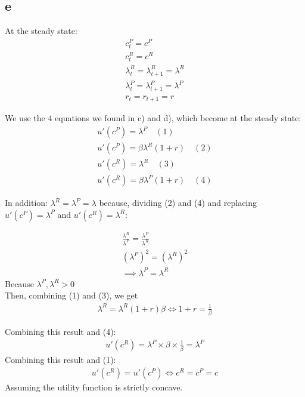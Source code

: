 \documentclass{article}
\begin{document}
\subsection{e}
At the steady state: \\
\begin{gather*}
    c_t^P=c^P\\
    c_t^R=c^R\\
    \lambda^R_t=\lambda^R_{t+1}=\lambda^R\\
    \lambda^P_t=\lambda^P_{t+1}=\lambda^P\\
    r_t=r_{t+1}=r
\end{gather*}

We use the 4 equations we found in c) and d), which become at the steady state:
\begin{gather*}
    u'(c^P)=\lambda^P\quad (1)\\
    u'(c^P)=\beta\lambda^R (1+r)\quad (2)\\
    u'(c^R)=\lambda^R\quad (3)\\
    u'(c^R)=\beta\lambda^P (1+r)\quad (4)
\end{gather*}

In addition: $\lambda^R=\lambda^P=\lambda$ because, dividing (2) and (4) and replacing $u'(c^P)=\lambda^P$ and $u'(c^R)=\lambda^R$:

\begin{gather*}
    \frac{\lambda^R}{\lambda^P} = \frac{\lambda^P}{\lambda^R} \\
    (\lambda^{P})^2 = (\lambda^{R})^2 \\
    \implies \lambda^P = \lambda^R
\end{gather*}
Because $\lambda^P, \lambda^R>0$ \\

Then, combining (1) and (3), we get
\begin{gather*}
    \lambda^R=\lambda^R(1+r)\beta\Leftrightarrow 1+r=\frac{1}{\beta}
\end{gather*}

Combining this result and (4):
\begin{gather*}
    u'(c^R)=\lambda^P\times\beta\times\frac{1}{\beta}=\lambda^P
\end{gather*}
Combining this result and (1):
\begin{gather*}
    u'(c^R)=u'(c^P)\Leftrightarrow c^R=c^P=c
\end{gather*}
Assuming the utility function is strictly concave.
\end{document}
